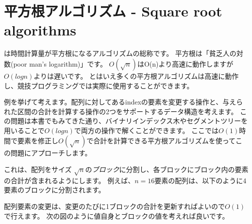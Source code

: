 \chapter{平方根アルゴリズム - Square root algorithms}


は時間計算量が平方根になるアルゴリズムの総称です。
平方根は「貧乏人の対数(poor man's logarithm)」です。
$O(\sqrt n)$はO(n)より高速に動作しますが$O(log n)$よりは遅いです。
とはいえ多くの平方根アルゴリズムは高速に動作し、競技プログラミングでは実際に使用することができます。

例を挙げて考えます。配列に対してあるindexの要素を変更する操作と、与えられた区間の合計を計算する操作の2つをサポートするデータ構造を考えます。
この問題は本書でもみてきた通り、バイナリインデックス木やセグメントツリーを用いることで$O(log n)$で両方の操作で解くことができます。
ここでは$O(1)$時間で要素を修正し$O(\sqrt n)$で合計を計算できる平方根アルゴリズムを使ってこの問題にアプローチします。

これは、配列をサイズ $\sqrt n$の\emph{ブロック}に分割し、各ブロックにブロック内の要素の合計が含まれるようにします。
例えば、$n=16$要素の配列は、以下のように4要素のブロックに分割されます。

\begin{center}
\end{center}


配列要素の変更は、変更のたびに1ブロックの合計を更新すればよいので$O(1)$で行えます。
次の図のように値自身とブロックの値を考えれば良いです。

